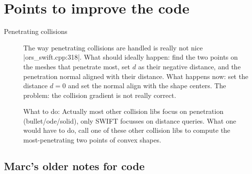 \section{Points to improve the code}

\begin{description}
\item[Penetrating collisions] The way penetrating collisions are
handled is really not nice |ors\_swift.cpp:318|. What should ideally
happen: find the two points on the meshes that penetrate most, set $d$
as their negative distance, and the penetration normal aligned with
their distance. What happens now: set the distance $d=0$ and set the
normal align with the shape centers. The problem: the collision
gradient is not really correct.

What to do: Actually most other collision libs focus on penetration
(bullet/ode/solid), only SWIFT focusses on distance queries. What one
would have to do, call one of these other collision libs to compute
the most-penetrating two points of convex shapes.


\end{description}

\subsection{Marc's older notes for code}

